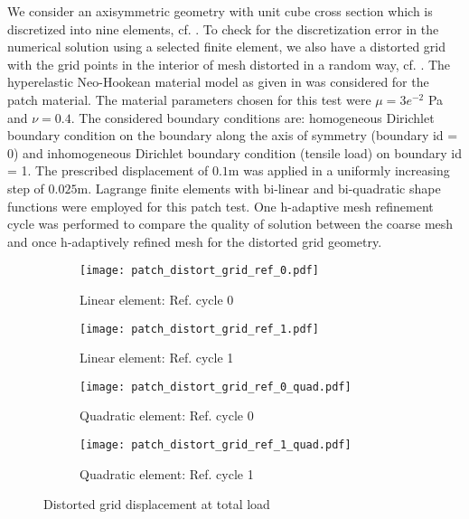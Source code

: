 We consider an axisymmetric geometry with unit cube cross section which is discretized into nine elements, cf. . To check for the discretization error in the numerical solution using a selected finite element, we also have a distorted grid with the grid points in the interior of mesh distorted in a random way, cf. . The hyperelastic Neo-Hookean material model as given in  was considered for the patch material. The material parameters chosen for this test were $\mu = 3e^{-2}$ Pa and $\nu = 0.4$. The considered boundary conditions are: homogeneous Dirichlet boundary condition on the boundary along the axis of symmetry (boundary id = 0) and inhomogeneous Dirichlet boundary condition (tensile load) on boundary id = 1. The prescribed displacement of $0.1 $m was applied in a uniformly increasing step of $0.025 $m. Lagrange finite elements with bi-linear and bi-quadratic shape functions were employed for this patch test. One h-adaptive mesh refinement cycle was performed to compare the quality of solution between the coarse mesh and once h-adaptively refined mesh for the distorted grid geometry. \par 

\begin{figure}[h]
\centering
\begin{subfigure}[b]{0.35\textwidth}
\centering
\texttt{[image: patch\_distort\_grid\_ref\_0.pdf]}
\caption{Linear element: Ref. cycle 0}
\label{fig:2.2.1}
\end{subfigure}
\begin{subfigure}[b]{0.35\textwidth}
\centering
\texttt{[image: patch\_distort\_grid\_ref\_1.pdf]}
\caption{Linear element: Ref. cycle 1}
\label{fig:2.2.2}
\end{subfigure}
\begin{subfigure}[b]{0.35\textwidth}
\centering
\texttt{[image: patch\_distort\_grid\_ref\_0\_quad.pdf]}
\caption{Quadratic element: Ref. cycle 0}
\label{fig:2.2.3}
\end{subfigure}
\begin{subfigure}[b]{0.35\textwidth}
\centering
\texttt{[image: patch\_distort\_grid\_ref\_1\_quad.pdf]}
\caption{Quadratic element: Ref. cycle 1}
\label{fig:2.2.4}
\end{subfigure}
\caption{Distorted grid displacement at total load}
\label{fig:2.2}
\end{figure}

